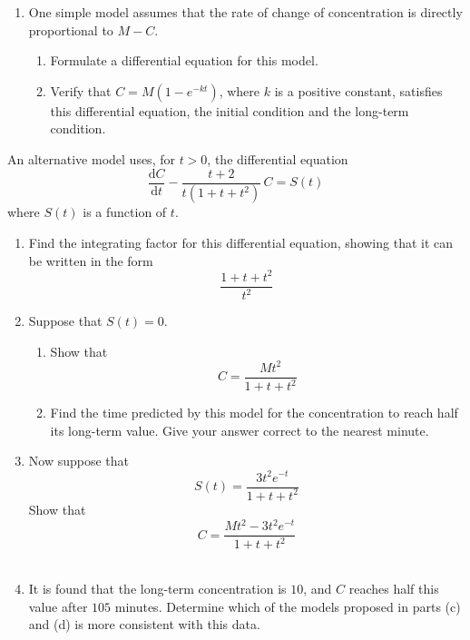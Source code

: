 \documentclass[leqno]{article}
\begin{document}
\begin{enumerate}[
  label=\textbf{\arabic*.},
  leftmargin=*,
  topsep=0pt,
  partopsep=0pt,
  parsep=0pt
]
\begin{enumerate}[label=\textbf{(\alph*)}]
  \item One simple model assumes that the rate of change of concentration is directly proportional to $M-C$. \\
  \begin{enumerate}[label=(\roman*)]
    \item Formulate a differential equation for this model.  \\
    \item Verify that $C=M(1-e^{-kt})$, where $k$ is a positive constant, satisfies this differential equation, the initial condition and the long-term condition.  \\
  \end{enumerate}
\end{enumerate}
An alternative model uses, for $t>0$, the differential equation
\[
\frac{\mathrm{d}C}{\mathrm{d}t}-\frac{t+2}{t(1+t+t^2)}\,C=S(t)
\]
where $S(t)$ is a function of $t$. \\
\begin{enumerate}[label=\textbf{(\alph*)}, resume]
  \item Find the integrating factor for this differential equation, showing that it can be written in the form
  \[
  \frac{1+t+t^2}{t^2}
  \]
  \item Suppose that $S(t)=0$. \\
  \begin{enumerate}[label=(\roman*)]
    \item Show that
    \[
    C=\frac{Mt^2}{1+t+t^2}
    \]
    \item Find the time predicted by this model for the concentration to reach half its long-term value. Give your answer correct to the nearest minute.  \\
  \end{enumerate}
  \item Now suppose that
  \[
  S(t)=\frac{3t^2 e^{-t}}{1+t+t^2}
  \]
  Show that
  \[
  C=\frac{Mt^2-3t^2 e^{-t}}{1+t+t^2}
  \]  \\
  \item It is found that the long-term concentration is $10$, and $C$ reaches half this value after $105$ minutes. Determine which of the models proposed in parts (c) and (d) is more consistent with this data.  \\
\end{enumerate}


\end{enumerate}
\end{document}
